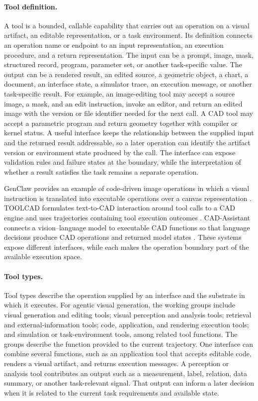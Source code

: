 \paragraph{Tool definition.}
A tool is a bounded, callable capability that carries out an operation on a visual artifact, an editable representation, or a task environment. Its definition connects an operation name or endpoint to an input representation, an execution procedure, and a return representation. The input can be a prompt, image, mask, structured record, program, parameter set, or another task-specific value. The output can be a rendered result, an edited source, a geometric object, a chart, a document, an interface state, a simulator trace, an execution message, or another task-specific result. For example, an image-editing tool may accept a source image, a mask, and an edit instruction, invoke an editor, and return an edited image with the version or file identifier needed for the next call. A CAD tool may accept a parametric program and return geometry together with compiler or kernel status. A useful interface keeps the relationship between the supplied input and the returned result addressable, so a later operation can identify the artifact version or environment state produced by the call. The interface can expose validation rules and failure states at the boundary, while the interpretation of whether a result satisfies the task remains a separate operation.

GenClaw provides an example of code-driven image operations in which a visual instruction is translated into executable operations over a canvas representation \cite{ye2026genclaw}. TOOLCAD formulates text-to-CAD interaction around tool calls to a CAD engine and uses trajectories containing tool execution outcomes \cite{gong2026toolcad}. CAD-Assistant connects a vision--language model to executable CAD functions so that language decisions produce CAD operations and returned model states \cite{mallis2024cadassistant}. These systems expose different interfaces, while each makes the operation boundary part of the available execution space.

\paragraph{Tool types.}
Tool types describe the operation supplied by an interface and the substrate in which it executes. For agentic visual generation, the working groups include visual generation and editing tools; visual perception and analysis tools; retrieval and external-information tools; code, application, and rendering execution tools; and simulation or task-environment tools, among related tool functions. The groups describe the function provided to the current trajectory. One interface can combine several functions, such as an application tool that accepts editable code, renders a visual artifact, and returns execution messages. A perception or analysis tool contributes an output such as a measurement, label, relation, data summary, or another task-relevant signal. That output can inform a later decision when it is related to the current task requirements and available state.

